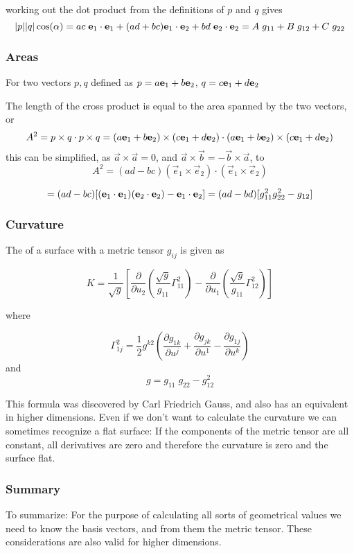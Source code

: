 working out the dot product from the definitions of $p$ and $q$ gives
$$
|p| |q| \cos(\alpha) = ac\;\mathbf{e}_1\cdot\mathbf{e}_1 + (ad + bc)\mathbf{e}_1\cdot\mathbf{e}_2 + bd\;\mathbf{e}_2\cdot\mathbf{e}_2 = A\;g_{11} + B\;g_{12} + C\;g_{22}
$$

\subsubsection{Areas}
For two vectors $p,q$ defined as 
$p=a \mathbf{e}_1 + b \mathbf{e}_2$, $q=c \mathbf{e}_1 + d \mathbf{e}_2$

The length of the cross product is equal to the area spanned by the two vectors, or 
$$
   A^2 = p\times q \cdot p\times q = (a \mathbf{e}_1 + b \mathbf{e}_2)\times(c \mathbf{e}_1 + d \mathbf{e}_2) \cdot (a \mathbf{e}_1 + b \mathbf{e}_2)\times(c \mathbf{e}_1 + d \mathbf{e}_2)
$$
this can be simplified, as $\vec{a}\times\vec{a}=0$, and $\vec{a}\times\vec{b} = -\vec{b}\times\vec{a}$, to
$$
  A^2 = (ad - bc)(\vec{e}_1\times\vec{e}_2)\cdot(\vec{e}_1\times\vec{e}_2) 
$$

$$
  = (ad-bc)[(\mathbf{e}_1\cdot\mathbf{e}_1)(\mathbf{e}_2\cdot\mathbf{e}_2) - \mathbf{e}_1\cdot\mathbf{e}_2] = (ad-bd)[g_{11}^2g_{22}^2 - g_{12}]
$$

\subsubsection{Curvature}

The  of a surface with a metric tensor $g_{ij}$ is given as 

$$
  K =  
   \frac{1}{\sqrt{g}} \left[
        \frac{\partial}{\partial u_2} \left( \frac{\sqrt{g}}{g_{11}}\Gamma^2_{11}   \right)
      - \frac{\partial}{\partial u_1} \left( \frac{\sqrt{g}}{g_{11}}\Gamma^2_{12}   \right)
     \right]
$$

where 

$$
    \Gamma^2_{1j} = \frac{1}{2} g^{k2} \left( \frac{\partial g_{1k}}{\partial u^j}  
                 +\frac{\partial g_{jk}}{\partial u^1}
                 -\frac{\partial g_{1j}}{\partial u^k}
       \right)
$$
and
$$
    g = g_{11}\;g_{22} - g_{12}^2
$$


This formula was discovered by Carl Friedrich Gauss, and also has an equivalent in higher 
dimensions. Even if we don't want to calculate the curvature we can 
sometimes recognize a flat surface: If the components of the metric tensor are 
all constant, all derivatives are zero and therefore the curvature is zero and the surface flat.

\subsubsection{Summary}
To summarize: For the purpose of calculating all sorts of geometrical values we need to know the basis vectors, and from them
the metric tensor. These considerations are also valid for higher dimensions.


